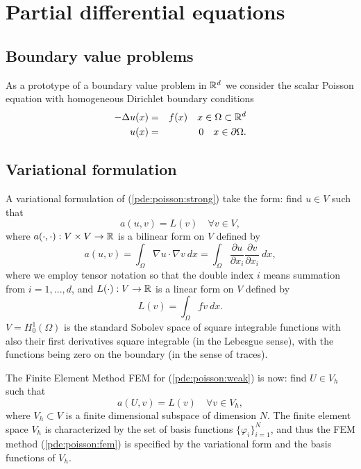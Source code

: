 \chapter{Partial differential equations}
\label{sec:pde}

\section{Boundary value problems}

As a prototype of a boundary value problem in $\Bbb{R}^d$ we consider the 
scalar Poisson equation with homogeneous Dirichlet boundary conditions 
\begin{eqnarray}
-\Delta u(x)&=&f(x) \quad x\in \Omega \subset \Bbb{R}^d \label{pde:poisson:strong} \\
u(x)&=&0 \quad x\in \partial \Omega. \nonumber  
\end{eqnarray}

\section{Variational formulation}

A variational formulation of (\ref{pde:poisson:strong}) take the form: 
find $u\in V$ such that  
\begin{equation}\label{pde:poisson:weak}
a(u,v)=L(v) \quad \forall v\in V, 
\end{equation}
where $a(\cdot,\cdot):V\times V\rightarrow \Bbb{R}$ is a bilinear form 
on $V$ defined by 
\begin{equation}
a(u,v)=\int_{\Omega} \nabla u \cdot \nabla v ~dx 
=\int_{\Omega} \frac{\partial u}{\partial x_i} \frac{\partial v}{\partial x_i} ~ dx,  
\end{equation}
where we employ tensor notation so that the double index $i$ means summation from $i=1,...,d$, 
and $L(\cdot):V\rightarrow \Bbb{R}$ is a linear form on $V$ defined by 
\begin{equation}
L(v)=\int_{\Omega} f v ~dx.  
\end{equation}
$V=H^1_0(\Omega)$ is the standard Sobolev space of square integrable 
functions with also their first derivatives square integrable (in the Lebesgue sense), 
with the functions being zero on the boundary (in the sense of traces).   

The Finite Element Method FEM for (\ref{pde:poisson:weak}) is now: 
find $U\in V_h$ such that  
\begin{equation}\label{pde:poisson:fem}
a(U,v)=L(v) \quad \forall v\in V_h, 
\end{equation}
where $V_h\subset V$ is a finite dimensional subspace of dimension $N$. 
The finite element space $V_h$ is characterized by the set of basis 
functions $\{\varphi_i\}_{i=1}^N$, and thus the FEM method 
(\ref{pde:poisson:fem}) is specified by the variational form and 
the basis functions of $V_h$. 

